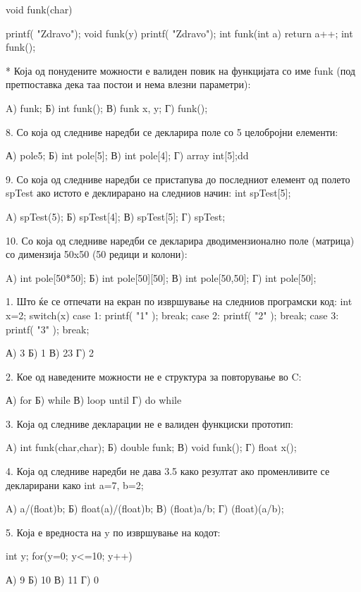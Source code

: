 {void funk(char) { printf( "Zdravo");
void funk(y) { printf( "Zdravo"); } 
int funk(int a) {return a++;}        
int funk();

* Која од понудените можности е валиден повик на функцијата со име funk (под претпоставка дека таа постои и нема влезни параметри):

A) funk;                    Б) int funk();
В) funk x, y;               Г) funk();

8. Со која од следниве наредби се декларира поле со 5 целобројни елементи:

А) pole{5};             Б) int pole[5];
В) int pole[4];             Г) array int[5];dd

9. Со која од следниве наредби се пристапува до последниот елемент од полето spTest ако истото е деклирарано на следниов начин: int spTest[5];

A) spTest(5);               Б) spTest[4];
В) spTest[5];               Г) spTest;

10. Со која од следниве наредби се декларира дводимензионално поле (матрица) со димензија 50x50 (50 редици и колони):

A) int pole[50*50];         Б) int pole[50][50];
В) int pole[50,50];         Г) int pole[50];

1. Што ќе се отпечати на екран по извршување на следниов програмски код:
int x=2;
switch(x)
{
  case 1: printf( "1" ); break;
  case 2: printf( "2" ); break;
  case 3: printf( "3" ); break;
}

А) 3                    Б) 1
В) 23                   Г) 2   

2. Кое од наведените можности не е структура за повторување во C:

А) for                  Б) while
В) loop until               Г) do while

3. Која од следниве декларации не е валиден функциски прототип:

A) int funk(char,char);     Б) double funk;
В) void funk();             Г) float x();

4. Која од следниве наредби не дава 3.5 како резултат ако променливите се декларирани како int a=7, b=2;

A) a/(float)b;                  Б) float(a)/(float)b;
В) (float)a/b;                  Г) (float)(a/b);

5. Која е вредноста на y по извршување на кодот: 

int y; for(y=0; y<=10; y++) {} 

А) 9                        Б) 10
В) 11                       Г) 0



}}
